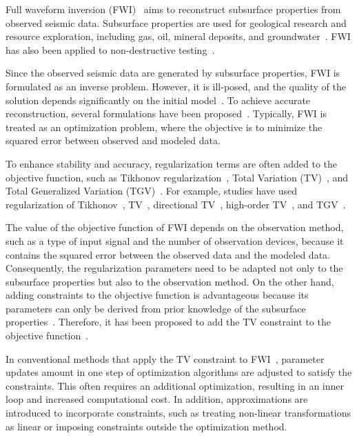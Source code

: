 Full waveform inversion (FWI)~\cite{FWI0,FWI1} aims to reconstruct subsurface properties from observed seismic data.
Subsurface properties are used for geological research and resource exploration, including gas, oil, mineral deposits, and groundwater~\cite{FWI1,FWIApplicationGroundwater0,FWIApplicationGroundwater1}.
FWI has also been applied to non-destructive testing~\cite{FWIApplicationNonDestructiveTesting0,FWIApplicationNonDestructiveTesting1}.

Since the observed seismic data are generated by subsurface properties, FWI is formulated as an inverse problem.
However, it is ill-posed, and the quality of the solution depends significantly on the initial model~\cite{FWI1}.
To achieve accurate reconstruction, several formulations have been proposed~\cite{FWI0,CustomFWI0,CustomFWI1,CustomFWI2,CustomFWI3,CustomFWI4,CustomFWI5}.
Typically, FWI is treated as an optimization problem, where the objective is to minimize the squared error between observed and modeled data.

To enhance stability and accuracy, regularization terms are often added to the objective function, such as Tikhonov regularization~\cite{tikhonov}, Total Variation (TV)~\cite{TV}, and Total Generalized Variation (TGV)~\cite{TGV}.
For example, studies have used regularization of Tikhonov~\cite{FWI-with-tikhonov-regularization}, TV~\cite{FWI-with-TV-regularization}, directional TV~\cite{FWI-with-directional-TV-regularization}, high-order TV~\cite{FWI-with-high-order-TV-regularization}, and TGV~\cite{FWI-with-TGV-regularization}.

The value of the objective function of FWI depends on the observation method, such as a type of input signal and the number of observation devices, because it contains the squared error between the observed data and the modeled data.
Consequently, the regularization parameters need to be adapted not only to the subsurface properties but also to the observation method.
On the other hand, adding constraints to the objective function is advantageous because its parameters can only be derived from prior knowledge of the subsurface properties~\cite{constraints-vs-penalties-in-FWI}.
Therefore, it has been proposed to add the TV constraint to the objective function~\cite{FWI-with-TV-constraint,FWI-with-TV-constraint2,FWI-with-TV-constraint3}.

In conventional methods that apply the TV constraint to FWI~\cite{FWI-with-TV-constraint,FWI-with-TV-constraint2}, parameter updates amount in one step of optimization algorithms are adjusted to satisfy the constraints.
This often requires an additional optimization, resulting in an inner loop and increased computational cost.
In addition, approximations are introduced to incorporate constraints, such as treating non-linear transformations as linear or imposing constraints outside the optimization method.

